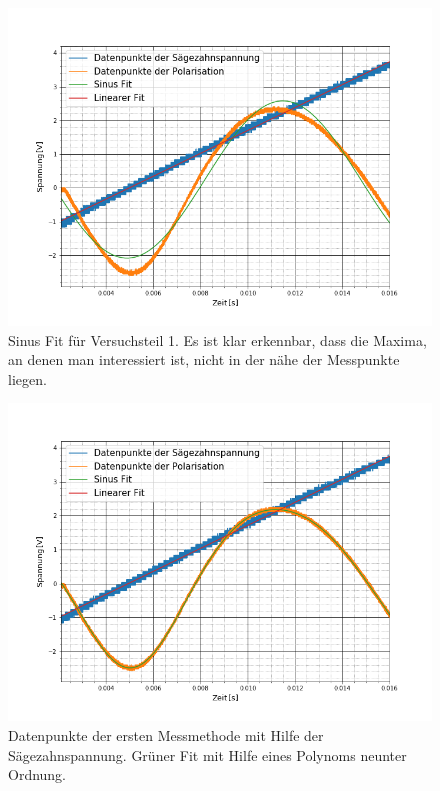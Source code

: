 \begin{figure}[ht]
	\includegraphics[scale=0.5]{Bild/SinusProblem}
	\centering
	\caption[Sinus Fit an die Messpunkte Versuchsteil 1]{Sinus Fit für Versuchsteil 1. Es ist klar erkennbar, dass die Maxima, an denen man interessiert ist, nicht in der nähe der Messpunkte liegen.}
	\label{ProbelmSinus}
\end{figure}
\begin{figure}[ht]
	\includegraphics[scale=0.5]{Bild/V1_2}
	\centering
	\caption[Plot zu Versuchsteil 1 Nr.2]{Datenpunkte der ersten Messmethode mit Hilfe der Sägezahnspannung. Grüner Fit mit Hilfe eines Polynoms neunter Ordnung.}
\end{figure}
